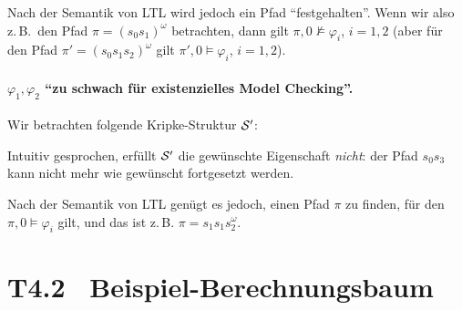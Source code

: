 \documentclass[fontsize=11pt, twoside=false, numbers=autoenddot]{scrbook}
\begin{document}
Nach der Semantik von LTL wird jedoch ein Pfad "`festgehalten"'.
Wenn wir also z.\,B.\ den Pfad $\pi = (s_0s_1)^\omega$ betrachten,
dann gilt $\pi,0 \not\models \varphi_i$, $i=1,2$
(aber für den Pfad $\pi' = (s_0s_1s_2)^\omega$ gilt
$\pi',0 \models \varphi_i$, $i=1,2$).

\paragraph*{{\boldmath $\varphi_1,\varphi_2$ "`zu schwach für existenzielles Model Checking"'.}}
Wir betrachten folgende Kripke-Struktur $\mathcal{S}'$:
%
\begin{center}
\end{center}
%
Intuitiv gesprochen, erfüllt $\mathcal{S}'$ die gewünschte Eigenschaft
\emph{nicht}: der Pfad $s_0s_3$ kann nicht mehr wie gewünscht fortgesetzt werden.

Nach der Semantik von LTL genügt es jedoch, einen Pfad $\pi$ zu finden,
für den $\pi,0 \models \varphi_i$ gilt,
und das ist z.\,B. $\pi = s_1s_1s_2^\omega$.

\pagebreak
\section*{T4.2~ Beispiel-Berechnungsbaum}
\end{document}
